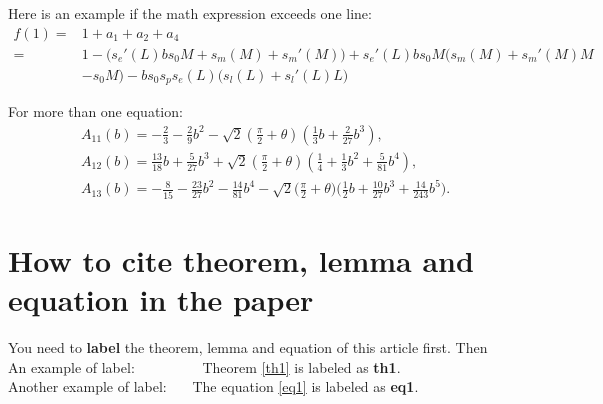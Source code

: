 \documentclass{uestcMath}
\begin{document}

Here is an example if the math expression exceeds one line:
\begin{align}
f(1)=&1 + a_1 + a_2 + a_4 \nonumber\\
=&1-\Big(s_e'(L)bs_0M + s_m(M)+s_m'(M)\Big)
+s_e'(L)bs_0M \Big(s_m(M)+s_m'(M)M\nonumber\\
&-s_0M\Big) - b s_0 s_ps_e(L)\Big(s_l(L)+s_l'(L)L\Big)
\end{align}

For more than one equation:
\begin{align}
&A_{11}(b)=-\frac{2}{3}-\frac{2}{9}b^2-\sqrt 2\left(\frac{\pi}{2}+\theta\right)\left(\frac{1}{3}b+\frac{2}{27}b^3\right),\nonumber\\
&A_{12}(b)=\frac{13}{18}b+\frac{5}{27}b^3+\sqrt2\left(\frac{\pi}{2}+\theta\right)\left(\frac{1}{4}+\frac{1}{3}b^2+\frac{5}{81}b^4\right),\nonumber\\
&A_{13}(b)=-\frac{8}{15}-\frac{23}{27}b^2-\frac{14}{81}b^4-\sqrt2\Big(\frac{\pi}{2}+\theta\Big)\Big(\frac{1}{2}b+\frac{10}{27}b^3+\frac{14}{243}b^5\Big).\label{eq1}
\end{align}





\section{How to cite theorem, lemma and equation in the paper}

You need to {\bf label} the theorem, lemma and equation of this article first. Then \\

An example of label: ~~~~~~~~~Theorem \ref{th1} is labeled as {\bf th1}. \\

Another example of label: ~~~The equation \eqref{eq1} is labeled as {\bf eq1}.
\end{document}
